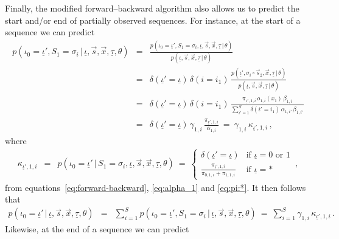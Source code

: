 \documentclass[a4paper]{article}
\begin{document}
Finally, the modified forward--backward algorithm also allows us to predict the start and/or end of partially observed sequences.
For instance, at the start of a sequence we can predict
\begin{eqnarray}
    p(\iota_0\!=\!\underline{\iota}',S_1\!=\!\sigma_i\,|\,\underline{\iota},\vec{s},\vec{x},\underline{\tau},\theta) 
& = &
   \frac{p(\iota_0\!=\!\underline{\iota}',S_1\!=\!\sigma_i,\underline{\iota},\vec{s},\vec{x},\underline{\tau}\,|\,\theta) }
           {p(\underline{\iota},\vec{s},\vec{x},\underline{\tau}\,|\,\theta) }
\nonumber\\& = &
   \delta(\underline{\iota}'\!=\!\underline{\iota})\,\delta(i\!=\!i_1)\,
\frac{p(\underline{\iota}',\sigma_i\circ\vec{s}_2,\vec{x},\underline{\tau}\,|\,\theta) }
           {p(\underline{\iota},\vec{s},\vec{x},\underline{\tau}\,|\,\theta) }
\nonumber\\& = &
   \delta(\underline{\iota}'\!=\!\underline{\iota})\,\delta(i\!=\!i_1)\,
\frac{\pi_{\underline{\iota}',1,i}\,o_{1,i}(x_1)\,\beta_{1,i}}
{\sum_{i'=1}^S\delta(i'\!=\!i_1)\,\alpha_{1,i'}\,\beta_{1,i'}}
\nonumber\\& = &
\delta(\underline{\iota}'\!=\!\underline{\iota})\,\gamma_{1,i}\,\frac{\pi_{\underline{\iota}',1,i}}{\bar{\alpha}_{1,i}}~=~
\gamma_{1,i}\,\kappa_{\underline{\iota}',1,i}
\,,
\label{eq:p_i0_s1_g_v}
\end{eqnarray}
where
\begin{eqnarray}
   \kappa_{\underline{\iota}',1,i} & = &
    p(\iota_0\!=\!\underline{\iota}'\,|\,S_1\!=\!\sigma_i,\underline{\iota},\vec{s},\vec{x},\underline{\tau},\theta) 
~=~\left\{\begin{array}{ll}
  \delta(\underline{\iota}'\!=\!\underline{\iota}) & \mbox{if }\underline{\iota}=0 \mbox{ or } 1
\\
  \frac{\pi_{\underline{\iota}',1,i}}{\pi_{0,1,i}+\pi_{1,1,i}} & \mbox{if }\underline{\iota}=*
\end{array}\right.\,,
\end{eqnarray}
from equations~\eqref{eq:forward-backward}, \eqref{eq:alpha_1} and \eqref{eq:pi:*}. 
It then follows that
\begin{eqnarray}
    p(\iota_0\!=\!\underline{\iota}'\,|\,\underline{\iota},\vec{s},\vec{x},\underline{\tau},\theta) 
& = &
\sum_{i=1}^S
    p(\iota_0\!=\!\underline{\iota}',S_1\!=\!\sigma_i\,|\,\underline{\iota},\vec{s},\vec{x},\underline{\tau},\theta) 
~=~\sum_{i=1}^S\gamma_{1,i}\,\kappa_{\underline{\iota}',1,i}
\,.
\end{eqnarray}
Likewise, at the end of a sequence we can predict
\end{document}

